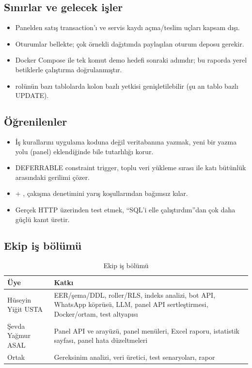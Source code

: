 \documentclass[11pt,a4paper]{article}
\newcommand{\kod}[1]{\texttt{\detokenize{#1}}}
\begin{document}
\subsection{Sınırlar ve gelecek işler}

\begin{itemize}[leftmargin=1.2em]
  \item Panelden satış transaction'ı ve servis kaydı açma/teslim uçları kapsam dışı.
  \item Oturumlar bellekte; çok örnekli dağıtımda paylaşılan oturum deposu gerekir.
  \item Docker Compose ile tek komut demo hedefi sonraki adımdır; bu raporda yerel
        betiklerle çalıştırma doğrulanmıştır.
  \item \kod{personel} rolünün bazı tablolarda kolon bazlı yetkisi genişletilebilir
        (şu an tablo bazlı UPDATE).
\end{itemize}

\subsection{Öğrenilenler}

\begin{itemize}[leftmargin=1.2em]
  \item İş kurallarını uygulama koduna değil veritabanına yazmak, yeni bir yazma
        yolu (panel) eklendiğinde bile tutarlılığı korur.
  \item DEFERRABLE constraint trigger, toplu veri yükleme sırası ile katı bütünlük
        arasındaki gerilimi çözer.
  \item \kod{EXCLUDE} + \kod{btree_gist}, çakışma denetimini yarış koşullarından
        bağımsız kılar.
  \item Gerçek HTTP üzerinden test etmek, ``SQL'i elle çalıştırdım''dan çok daha
        güçlü kanıt üretir.
\end{itemize}

\subsection{Ekip iş bölümü}

\begin{table}[H]
\centering
\small
\begin{tabularx}{\textwidth}{@{}l X@{}}
\toprule
Üye & Katkı\\
\midrule
Hüseyin Yiğit USTA & EER/şema/DDL, roller/RLS, indeks analizi, bot API, WhatsApp
köprüsü, LLM, panel API sertleştirmesi, Docker/ortam, test altyapısı\\
Şevda Yağmur ASAL & Panel API ve arayüzü, panel menüleri, Excel raporu, istatistik
sayfası, panel hata düzeltmeleri\\
Ortak & Gereksinim analizi, veri üretici, test senaryoları, rapor\\
\bottomrule
\end{tabularx}
\caption{Ekip iş bölümü}
\label{tab:isbolumu}
\end{table}
\end{document}
